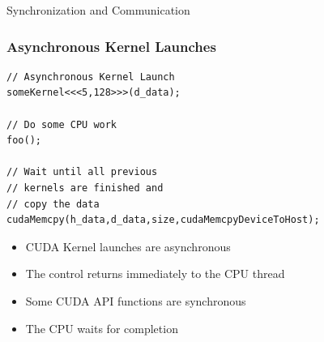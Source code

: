 \documentclass[aspectratio=169,handout]{beamer}
\begin{document}
\begin{frame}[fragile]
\begin{center}
\Large Synchronization and Communication
\end{center}
\end{frame}


\begin{frame}[fragile]
	\frametitle{Asynchronous Kernel Launches}
	\begin{minipage}{0.45\linewidth}
\begin{lstlisting}
// Asynchronous Kernel Launch
someKernel<<<5,128>>>(d_data);

// Do some CPU work
foo();

// Wait until all previous 
// kernels are finished and 
// copy the data
cudaMemcpy(h_data,d_data,size,cudaMemcpyDeviceToHost);
\end{lstlisting}
	\end{minipage}
	\begin{minipage}{0.5\linewidth}
\begin{itemize}
	\item<2-> CUDA Kernel launches are asynchronous
	\item<3->[$\rightarrow$] The control returns immediately to the CPU thread
	\item<4-> Some CUDA API functions are synchronous
	\item<5->[$\rightarrow$] The CPU waits for completion
\end{itemize}
	\end{minipage}
\end{frame}
\end{document}
